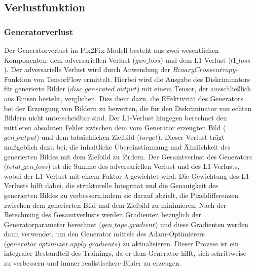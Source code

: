 \newpage
\subsection{Verlustfunktion}
\subsubsection{Generatorverlust}
Der Generatorverlust im Pix2Pix-Modell besteht aus zwei wesentlichen Komponenten: dem adversariellen Verlust ($gan\_loss$) und dem L1-Verlust ($l1\_loss$). Der adversarielle Verlust wird durch Anwendung der $BinaryCrossentropy$-Funktion von TensorFlow ermittelt. Hierbei wird die Ausgabe des Diskriminators für generierte Bilder ($disc\_generated\_output$) mit einem Tensor, der ausschließlich aus Einsen besteht, verglichen. Dies dient dazu, die Effektivität des Generators bei der Erzeugung von Bildern zu bewerten, die für den Diskriminator von echten Bildern nicht unterscheidbar sind. Der L1-Verlust hingegen berechnet den mittleren absoluten Fehler zwischen dem vom Generator erzeugten Bild ($gen\_output$) und dem tatsächlichen Zielbild ($target$). Dieser Verlust trägt maßgeblich dazu bei, die inhaltliche Übereinstimmung und Ähnlichkeit des generierten Bildes mit dem Zielbild zu fördern. \newline
Der Gesamtverlust des Generators ($total\_gen\_loss$) ist die Summe des adversariellen Verlust und des L1-Verlusts, wobei der L1-Verlust mit einem Faktor $\lambda$ gewichtet wird. Die Gewichtung des L1-Verlusts hilft dabei, die strukturelle Integrität und die Genauigkeit des generierten Bildes zu verbessern,indem sie darauf abzielt, die Pixeldifferenzen zwischen dem generierten Bild und dem Zielbild zu minimieren.\newline
Nach der Berechnung des Gesamtverlusts werden Gradienten bezüglich der Generatorparameter berechnet ($gen\_tape.gradient$) und diese Gradienten werden dann verwendet, um den Generator mittels des Adam-Optimierers \\($generator\_optimizer.apply\_gradients$) zu aktualisieren. Dieser Prozess ist ein integraler Bestandteil des Trainings, da er dem Generator hilft, sich schrittweise zu verbessern und immer realistischere Bilder zu erzeugen.

